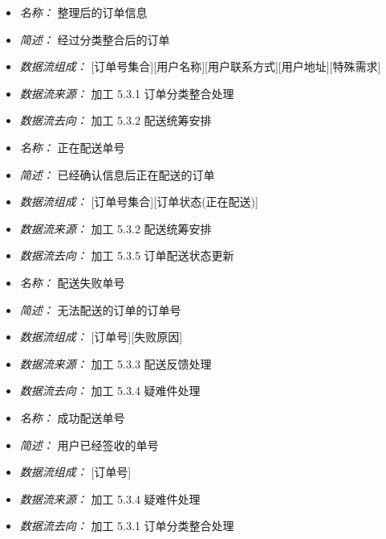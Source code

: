 \vspace{-1mm}



\begin{itemize}
\item \textit{名称： }整理后的订单信息
\item \textit{简述： }经过分类整合后的订单 
\item \textit{数据流组成： }[订单号集合][用户名称][用户联系方式][用户地址][特殊需求] 
\item \textit{数据流来源： }加工 5.3.1 订单分类整合处理
\item \textit{数据流去向： }加工 5.3.2 配送统筹安排

\end{itemize}


\vspace{-1mm}


\begin{itemize}
\item \textit{名称： }正在配送单号 
\item \textit{简述： }已经确认信息后正在配送的订单 
\item \textit{数据流组成： }[订单号集合][订单状态(正在配送)] 
\item \textit{数据流来源： }加工 5.3.2 配送统筹安排 
\item \textit{数据流去向： }加工 5.3.5 订单配送状态更新

\end{itemize}


\vspace{-1mm}


\begin{itemize}
\item \textit{名称： }配送失败单号 
\item \textit{简述： }无法配送的订单的订单号 
\item \textit{数据流组成： }[订单号][失败原因] 
\item \textit{数据流来源： }加工 5.3.3 配送反馈处理 
\item \textit{数据流去向： }加工 5.3.4 疑难件处理

\end{itemize}


\vspace{-1mm}


\begin{itemize}
\item \textit{名称： }成功配送单号
\item \textit{简述： }用户已经签收的单号
\item \textit{数据流组成： }[订单号]
\item \textit{数据流来源： }加工 5.3.4 疑难件处理 
\item \textit{数据流去向： }加工 5.3.1 订单分类整合处理

\end{itemize}


